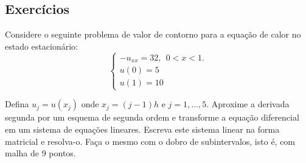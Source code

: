 \subsection*{Exercícios}

\begin{exer}
 Considere o seguinte problema de valor de contorno para a equação de calor no estado estacionário:
$$\left\{\begin{array}{l}-u_{xx}=32,~~ 0<x<1.\\
u(0)=5\\
u(1)=10\end{array}
\right.
$$

Defina $u_j=u(x_j)$ onde $x_j={(j-1)}{h}$ e $j=1,\ldots,5$. Aproxime a derivada segunda por um esquema de segunda ordem e transforme a equação diferencial em um sistema de equações lineares. Escreva este sistema linear na forma matricial e resolva-o. Faça o mesmo com o dobro de subintervalos, isto é, com malha de 9 pontos. 
\end{exer}
